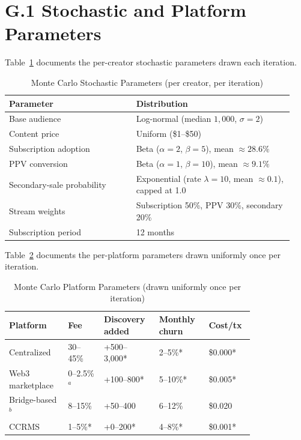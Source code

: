 \section*{G.1 Stochastic and Platform Parameters}

Table~\ref{tab:mc-params-creator-app} documents the per-creator stochastic parameters drawn each iteration.

\begin{table}[h]
\centering
\caption{Monte Carlo Stochastic Parameters (per creator, per iteration)}\label{tab:mc-params-creator-app}
\begin{tabular}{@{}p{0.42\linewidth} p{0.52\linewidth}@{}}
\toprule
\textbf{Parameter} & \textbf{Distribution} \\
\midrule
Base audience     & Log-normal (median $1{,}000$, $\sigma = 2$) \\
Content price     & Uniform (\$1--\$50) \\
Subscription adoption & Beta ($\alpha = 2$, $\beta = 5$), mean $\approx 28.6\%$ \\
PPV conversion    & Beta ($\alpha = 1$, $\beta = 10$), mean $\approx 9.1\%$ \\
Secondary-sale probability & Exponential (rate $\lambda = 10$, mean $\approx 0.1$), capped at 1.0 \\
Stream weights    & Subscription 50\%, PPV 30\%, secondary 20\% \\
Subscription period & 12 months \\
\bottomrule
\end{tabular}
\end{table}

Table~\ref{tab:mc-params-platform-app} documents the per-platform parameters drawn uniformly once per iteration.

\begin{table}[h]
\centering
\caption{Monte Carlo Platform Parameters (drawn uniformly once per iteration)}\label{tab:mc-params-platform-app}
\begin{tabular}{@{}p{0.20\linewidth} p{0.13\linewidth} p{0.18\linewidth} p{0.17\linewidth} p{0.13\linewidth}@{}}
\toprule
\textbf{Platform} & \textbf{Fee} & \textbf{Discovery added} & \textbf{Monthly churn} & \textbf{Cost/tx} \\
\midrule
Centralized      & 30--45\% & +500--3,000* & 2--5\%*   & \$0.000* \\
Web3 marketplace & 0--2.5\%$^a$ & +100--800*  & 5--10\%*  & \$0.005* \\
Bridge-based$^b$ & 8--15\%  & +50--400   & 6--12\%  & \$0.020 \\
CCRMS            & 1--5\%*  & +0--200*   & 4--8\%*   & \$0.001* \\
\bottomrule
\end{tabular}
\end{table}

